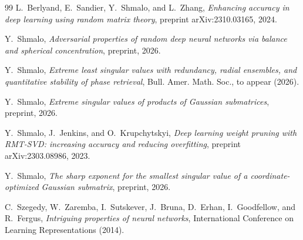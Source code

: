 \begin{thebibliography}{99}
L.~Berlyand, E.~Sandier, Y.~Shmalo, and L.~Zhang,
\emph{Enhancing accuracy in deep learning using random matrix theory},
preprint arXiv:2310.03165, 2024.

Y.~Shmalo,
\emph{Adversarial properties of random deep neural networks via balance and spherical concentration},
preprint, 2026.

Y.~Shmalo,
\emph{Extreme least singular values with redundancy, radial ensembles, and quantitative stability of phase retrieval},
Bull. Amer. Math. Soc., to appear (2026).

Y.~Shmalo,
\emph{Extreme singular values of products of Gaussian submatrices},
preprint, 2026.

Y.~Shmalo, J.~Jenkins, and O.~Krupchytskyi,
\emph{Deep learning weight pruning with RMT-SVD: increasing accuracy and reducing overfitting},
preprint arXiv:2303.08986, 2023.

Y.~Shmalo,
\emph{The sharp exponent for the smallest singular value of a coordinate-optimized Gaussian submatrix},
preprint, 2026.

C.~Szegedy, W.~Zaremba, I.~Sutskever, J.~Bruna, D.~Erhan, I.~Goodfellow, and R.~Fergus,
\emph{Intriguing properties of neural networks},
International Conference on Learning Representations (2014).

\end{thebibliography}
